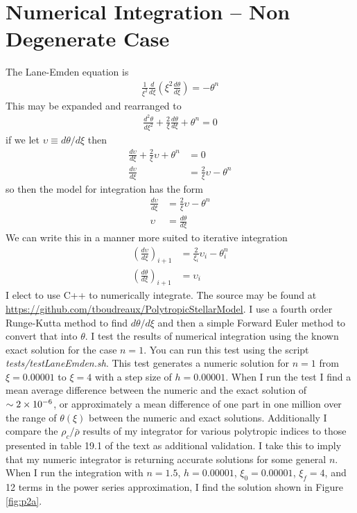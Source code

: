 \section{Numerical Integration -- Non Degenerate Case}
The Lane-Emden equation is 
\begin{align*}
    \frac{1}{\xi^{2}}\frac{d}{d\xi}\left(\xi^{2}\frac{d\theta}{d\xi}\right)  = -\theta^{n}  
\end{align*}
This may be expanded and rearranged to
\begin{align*}
    \frac{d^{2}\theta}{d\xi^{2}} + \frac{2}{\xi}\frac{d\theta}{d\xi} + \theta^{n}= 0
\end{align*}
if we let $\upsilon \equiv d\theta/d\xi$ then
\begin{align*}
    \frac{d\upsilon}{d\xi} + \frac{2}{\xi}\upsilon + \theta^{n} &= 0 \\
    \frac{d\upsilon}{d\xi} &= \frac{2}{\xi}\upsilon - \theta^{n}
\end{align*}
so then the model for integration has the form
\begin{align*}
    \frac{d\upsilon}{d\xi} &= \frac{2}{\xi}\upsilon - \theta^{n} \\
    \upsilon &= \frac{d\theta}{d\xi}
\end{align*}
We can write this in a manner more suited to iterative integration
\begin{align*}
    \left(\frac{d\upsilon}{d\xi}\right)_{i+1} &= \frac{2}{\xi_{i}}\upsilon_{i} - \theta_{i}^{n} \\
    \left(\frac{d\theta}{d\xi}\right)_{i+1} &= \upsilon_{i}
\end{align*}
I elect to use C++ to numerically integrate. The source may be found at \\ \href{https://github.com/tboudreaux/PolytropicStellarModel}{https://github.com/tboudreaux/PolytropicStellarModel}. I use a fourth order Runge-Kutta method to find $d\theta/d\xi$ and then a simple Forward Euler method to convert that into $\theta$. I test the results of numerical integration using the known exact solution for the case $n=1$. You can run this test using the script \textit{tests/testLaneEmden.sh}. This test generates a numeric solution for $n=1$ from $\xi=0.00001$ to $\xi=4$ with a step size of $h=0.00001$. When I run the test I find a mean average difference between the numeric and the exact solution of $\sim2\times10^{-6}$, or approximately a mean difference of one part in one million over the range of $\theta(\xi)$ between the numeric and exact solutions. Additionally I compare the $\rho_{c}/\bar{\rho}$ results of my integrator for various polytropic indices to those presented in table 19.1 of the text as additional validation. I take this to imply that my numeric integrator is returning accurate solutions for some general $n$. When I run the integration with $n=1.5$, $h=0.00001$, $\xi_{0}=0.00001$, $\xi_{f}=4$, and 12 terms in the power series approximation, I find the solution shown in Figure \ref{fig:p2a}.
